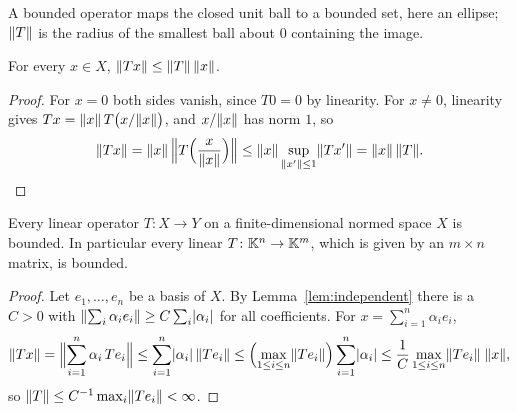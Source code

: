 \begin{nfigure}{A bounded operator maps the closed unit ball to a bounded set,
here an ellipse; $\lVert T\rVert$ is the radius of the smallest ball about $0$
containing the image.}
\end{nfigure}

\begin{remark}\label{rem:op-norm-bound}
For every $x \in X$, $\lVert Tx\rVert \le \lVert T\rVert\,\lVert x\rVert$.
\end{remark}

\begin{proof}
For $x = 0$ both sides vanish, since $T0 = 0$ by linearity. For $x \ne 0$,
linearity gives $Tx = \lVert x\rVert\, T\bigl(x / \lVert x\rVert\bigr)$, and
$x / \lVert x\rVert$ has norm $1$, so
\[
  \lVert Tx\rVert = \lVert x\rVert\, \Bigl\lVert T\Bigl(\frac{x}{\lVert x\rVert}\Bigr)
  \Bigr\rVert
  \le \lVert x\rVert \sup_{\lVert x'\rVert \le 1} \lVert Tx'\rVert = \lVert x\rVert\,\lVert T\rVert .
  \qedhere
\]
\end{proof}

\begin{example}\label{ex:finite-dim-bounded}
Every linear operator $T \colon X \to Y$ on a finite-dimensional normed space
$X$ is bounded. In particular every linear $T \colon \mathbb{K}^n \to \mathbb{K}^m$, which is
given by an $m \times n$ matrix, is bounded.
\end{example}

\begin{proof}
Let $e_1, \dots, e_n$ be a basis of $X$. By Lemma~\ref{lem:independent}
there is a $C > 0$ with $\lVert\sum_i \alpha_i e_i\rVert \ge C \sum_i
\lvert\alpha_i\rvert$ for all coefficients. For $x = \sum_{i=1}^{n} \alpha_i e_i$,
\[
  \lVert Tx\rVert = \Bigl\lVert \sum_{i=1}^{n} \alpha_i\, T e_i \Bigr\rVert
  \le \sum_{i=1}^{n} \lvert\alpha_i\rvert\,\lVert T e_i\rVert
  \le \Bigl(\max_{1 \le i \le n} \lVert T e_i\rVert\Bigr)
      \sum_{i=1}^{n} \lvert\alpha_i\rvert
  \le \frac{1}{C} \max_{1 \le i \le n} \lVert T e_i\rVert\; \lVert x\rVert,
\]
so $\lVert T\rVert \le C^{-1} \max_i \lVert T e_i\rVert < \infty$.
\end{proof}

